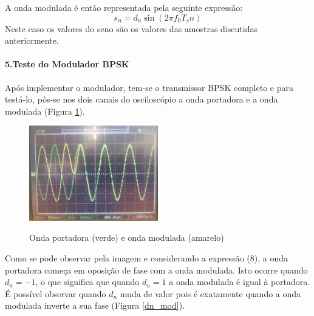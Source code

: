 \documentclass[11pt]{article}
\numberwithin{equation}{section}
\begin{document}
A onda modulada é então representada pela seguinte expressão:
\begin{equation}
	s_n= d_n \sin(2 \pi f_0T_sn) 
\end{equation}
Neste caso os valores do seno são os valores das amostras discutidas anteriormente.
\vspace{2 mm}

\paragraph{5.Teste do Modulador BPSK} \hspace{0pt}

Após implementar o modulador, tem-se o transmissor BPSK completo e para testá-lo, pôs-se nos dois canais do osciloscópio a onda portadora e a onda modulada (Figura \ref{port_mod}).
\begin{figure}[H]
	\centering
	\includegraphics[width=0.5\textwidth]{./port_mod}~\\
	\caption{Onda portadora (verde) e onda modulada (amarelo)}
	\label{port_mod}
\end{figure} 
 \vspace{2 mm}
 
 Como se pode observar pela imagem e considerando a expressão (8), a onda portadora começa em oposição de fase com a onda modulada. Isto ocorre quando $d_n=-1$, o que significa que quando $d_n=1$ a onda modulada é igual à portadora. É possível observar quando $d_n$ muda de valor pois é exatamente quando a onda modulada inverte a sua fase (Figura \ref{dn_mod}). 
 
\end{document}
